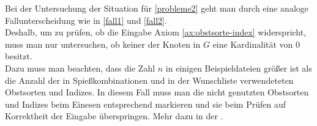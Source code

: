 Bei der Untersuchung der Situation für \ref{probleme2} geht man durch eine analoge Fallunterscheidung wie
in \ref{fall1} und \ref{fall2}.\\

Deshalb, um zu prüfen, ob die Eingabe Axiom \ref{ax:obstsorte-index} widerspricht, muss man 
nur untersuchen, ob keiner der Knoten in $G$ eine Kardinalität von 0 besitzt.\\
Dazu muss man beachten, dass die Zahl $n$ in einigen Beispieldateien größer ist
als die Anzahl der in Spießkombinationen und in der Wunschliste verwendeteten Obstsorten
und Indizes. In diesem Fall muss man die nicht genutzten Obstsorten und Indizes beim Einesen
entsprechend markieren und sie beim Prüfen auf Korrektheit der Eingabe überspringen. Mehr dazu
in der .
